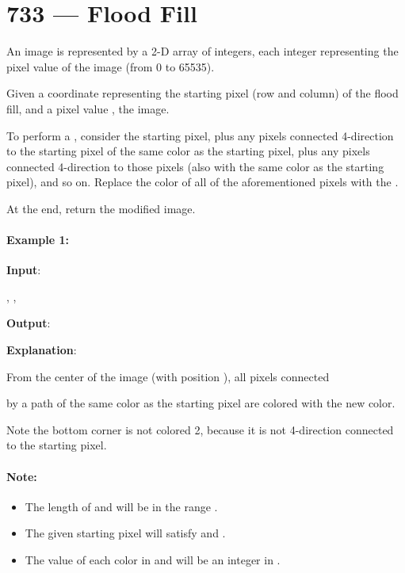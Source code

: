 \section{733 --- Flood Fill}
An image is represented by a 2-D array of integers, each integer representing the pixel value of the image (from 0 to 65535).

Given a coordinate  representing the starting pixel (row and column) of the flood fill, and a pixel value ,  the image.

To perform a , consider the starting pixel, plus any pixels connected 4-direction to the starting pixel of the same color as the starting pixel, plus any pixels connected 4-direction to those pixels (also with the same color as the starting pixel), and so on. Replace the color of all of the aforementioned pixels with the .

At the end, return the modified image.

\paragraph{Example 1:}

\textbf{Input}:
 

, , 

\textbf{Output}: \fcj{[[2,2,2],[2,2,0],[2,0,1]]}

\textbf{Explanation}:
 
From the center of the image (with position ), all pixels connected 

by a path of the same color as the starting pixel are colored with the new color.

Note the bottom corner is not colored 2, because it is not 4-direction connected to the starting pixel.

\paragraph{Note:}
\begin{itemize}
\item The length of  and  will be in the range \fcj{[1, 50]}.

\item The given starting pixel will satisfy  and .

\item The value of each color in  and  will be an integer in \fcj{[0, 65535]}.

\end{itemize}

